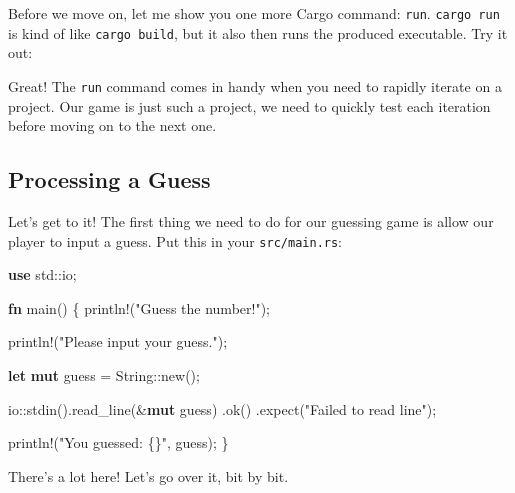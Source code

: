\documentclass[a4paper,]{book}
\newenvironment{Shaded}{\begin{snugshade}}{\end{snugshade}}
\newcommand{\KeywordTok}[1]{\textcolor[rgb]{0.13,0.29,0.53}{\textbf{{#1}}}}
\newcommand{\StringTok}[1]{\textcolor[rgb]{0.31,0.60,0.02}{{#1}}}
\newcommand{\OtherTok}[1]{\textcolor[rgb]{0.56,0.35,0.01}{{#1}}}
\newcommand{\NormalTok}[1]{{#1}}
\begin{document}
Before we move on, let me show you one more Cargo command: \texttt{run}.
\texttt{cargo\ run} is kind of like \texttt{cargo\ build}, but it also
then runs the produced executable. Try it out:

\begin{Shaded}
\end{Shaded}

Great! The \texttt{run} command comes in handy when you need to rapidly
iterate on a project. Our game is just such a project, we need to
quickly test each iteration before moving on to the next one.

\subsection{Processing a Guess}\label{processing-a-guess}

Let's get to it! The first thing we need to do for our guessing game is
allow our player to input a guess. Put this in your
\texttt{src/main.rs}:

\begin{Shaded}
\begin{Highlighting}[]
\KeywordTok{use} \NormalTok{std::io;}

\KeywordTok{fn} \NormalTok{main() \{}
    \OtherTok{println!}\NormalTok{(}\StringTok{"Guess the number!"}\NormalTok{);}

    \OtherTok{println!}\NormalTok{(}\StringTok{"Please input your guess."}\NormalTok{);}

    \KeywordTok{let} \KeywordTok{mut} \NormalTok{guess = String::new();}

    \NormalTok{io::stdin().read_line(&}\KeywordTok{mut} \NormalTok{guess)}
        \NormalTok{.ok()}
        \NormalTok{.expect(}\StringTok{"Failed to read line"}\NormalTok{);}

    \OtherTok{println!}\NormalTok{(}\StringTok{"You guessed: \{\}"}\NormalTok{, guess);}
\NormalTok{\}}
\end{Highlighting}
\end{Shaded}

There's a lot here! Let's go over it, bit by bit.
\end{document}
